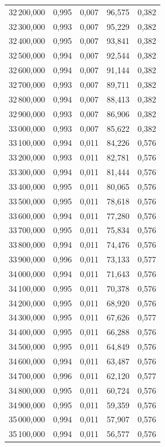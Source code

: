 \begin{longtable}{rrrrr}
32\,200,000 & 0,995 & 0,007 & 96,575 & 0,382\\
32\,300,000 & 0,993 & 0,007 & 95,229 & 0,382\\
32\,400,000 & 0,995 & 0,007 & 93,841 & 0,382\\
32\,500,000 & 0,994 & 0,007 & 92,544 & 0,382\\
32\,600,000 & 0,994 & 0,007 & 91,144 & 0,382\\
32\,700,000 & 0,993 & 0,007 & 89,711 & 0,382\\
32\,800,000 & 0,994 & 0,007 & 88,413 & 0,382\\
32\,900,000 & 0,993 & 0,007 & 86,906 & 0,382\\
33\,000,000 & 0,993 & 0,007 & 85,622 & 0,382\\
33\,100,000 & 0,994 & 0,011 & 84,226 & 0,576\\
33\,200,000 & 0,993 & 0,011 & 82,781 & 0,576\\
33\,300,000 & 0,994 & 0,011 & 81,444 & 0,576\\
33\,400,000 & 0,995 & 0,011 & 80,065 & 0,576\\
33\,500,000 & 0,995 & 0,011 & 78,618 & 0,576\\
33\,600,000 & 0,994 & 0,011 & 77,280 & 0,576\\
33\,700,000 & 0,995 & 0,011 & 75,834 & 0,576\\
33\,800,000 & 0,994 & 0,011 & 74,476 & 0,576\\
33\,900,000 & 0,996 & 0,011 & 73,133 & 0,577\\
34\,000,000 & 0,994 & 0,011 & 71,643 & 0,576\\
34\,100,000 & 0,995 & 0,011 & 70,378 & 0,576\\
34\,200,000 & 0,995 & 0,011 & 68,920 & 0,576\\
34\,300,000 & 0,995 & 0,011 & 67,626 & 0,577\\
34\,400,000 & 0,995 & 0,011 & 66,288 & 0,576\\
34\,500,000 & 0,995 & 0,011 & 64,849 & 0,576\\
34\,600,000 & 0,994 & 0,011 & 63,487 & 0,576\\
34\,700,000 & 0,996 & 0,011 & 62,120 & 0,577\\
34\,800,000 & 0,995 & 0,011 & 60,724 & 0,576\\
34\,900,000 & 0,995 & 0,011 & 59,359 & 0,576\\
35\,000,000 & 0,994 & 0,011 & 57,907 & 0,576\\
35\,100,000 & 0,994 & 0,011 & 56,577 & 0,576\\

\end{longtable}
